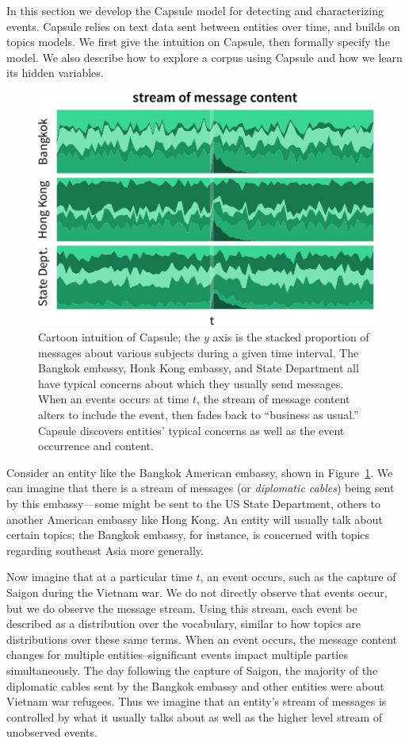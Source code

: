 
In this section we develop the Capsule model for detecting and characterizing events.  Capsule relies on text data sent between entities over time, and builds on topics models. We first give the intuition on Capsule, then formally specify the model.  We also describe how to explore a corpus using Capsule and how we learn its hidden variables.

\begin{figure}
\centering
\includegraphics[width=\linewidth]{fig/cartoon.pdf}
\caption{Cartoon intuition of Capsule; the $y$ axis is the stacked proportion of messages about various subjects during a given time interval.  The Bangkok embassy, Honk Kong embassy, and State Department all have typical concerns about which they usually send messages.  When an events occurs at time $t$, the stream of message content alters to include the event, then fades back to ``business as usual.''  Capsule discovers entities' typical concerns as well as the event occurrence and content.}
\label{fig:cartoon}
\end{figure}

Consider an entity like the Bangkok American embassy, shown in Figure~\ref{fig:cartoon}.  We can imagine that there is a stream of messages (or \emph{diplomatic cables}) being sent by this embassy---some might be sent to the US State Department, others to another American embassy like Hong Kong.  An entity will usually talk about certain topics; the Bangkok embassy, for instance, is concerned with topics regarding southeast Asia more generally.

Now imagine that at a particular time $t$, an event occurs, such as the capture of Saigon during the Vietnam war.  We do not directly observe that events occur, but we do observe the message stream.  Using this stream, each event be described as a distribution over the vocabulary, similar to how topics are distributions over these same terms.  When an event occurs, the message content changes for multiple entities--significant events impact multiple parties simultaneously. The day following the capture of Saigon, the majority of the diplomatic cables sent by the Bangkok embassy and other entities were about Vietnam war refugees.
Thus we imagine that an entity's stream of messages is controlled by what it usually talks about as well as the higher level stream of unobserved events.

